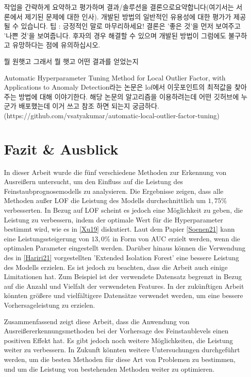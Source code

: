 작업을 간략하게 요약하고 평가하며 결과/솔루션을 결론으로 ​​요약합니다(여기서는 서론에서 제기된 문제에 대한 인사). 개발된 방법의 일반적인 유용성에 대한 평가가 제공될 수 있습니다. 팁 : 긍정적인 말로 마무리하세요! 결론은 '좋은 것'을 먼저 보여주고 '나쁜 것'을 보여줍니다. 후자의 경우 해결할 수 있으며 개발된 방법이 그럼에도 불구하고 유망하다는 점에 유의하십시오.

뭘 원햇고 그래서 뭘 햇고 어떤 결과를 얻었는지

Automatic Hyperparameter Tuning Method for Local Outlier Factor, with Applications to Anomaly Detection라는 논문은 lof에서 이웃포인트의 최적값을 찾아주는 방법에 대해 이야기한다. 해당 논문의 알고리즘을 이용하려는데 어떤 깃허브에 누군가 배포했는데 이거 쓰고 참조 하면 되는지 궁금하다.(https://github.com/vsatyakumar/automatic-local-outlier-factor-tuning)

\chapterpage\chapter{Fazit \& Ausblick}
    In dieser Arbeit wurde die fünf verschiedene Methoden zur Erkennung von Ausreißern untersucht, um den Einfluss auf die Leistung des Feinstaubprognosemodells zu analysieren. Die Ergebnisse zeigen, dass alle Methoden außer LOF die Leistung des Modells durchschnittlich um $1,75$\% verbesserten. In Bezug auf LOF scheint es jedoch eine Möglichkeit zu geben, die Leistung zu verbessern, indem der optimale Wert für die Hyperparameter bestimmt wird, wie es in \ref{Xu19} diskutiert. Laut dem Papier \ref{Soenen21} kann eine Leistungssteigerung von $13,0$\% in Form von AUC erzielt werden, wenn die optimalen Parameter eingestellt werden. Darüber hinaus können die Verwendung des in \ref{Hariri21} vorgestellten 'Extended Isolation Forest' eine bessere Leistung des Modells erzielen. Es ist jedoch zu beachten, dass die Arbeit auch einige Limitationen hat. Zum Beispiel ist der verwendete Datensatz begrenzt in Bezug auf die Anzahl und Vielfalt der verwendeten Features. In der zukünftigen Arbeit könnten größere und vielfältigere Datensätze verwendet werden, um eine bessere Vorhersageleistung zu erzielen.

    Zusammenfassend zeigt diese Arbeit, dass die Anwendung von Ausreißererkennungsmethoden bei der Vorhersage des Feinstaublevels einen positiven Effekt hat. Es gibt jedoch noch weitere Möglichkeiten, die Leistung weiter zu verbessern. In Zukunft könnten weitere Untersuchungen durchgeführt werden, um die besten Methoden für diese Art von Problemen zu bestimmen, und um die Leistung von bestehenden Methoden weiter zu optimieren.


